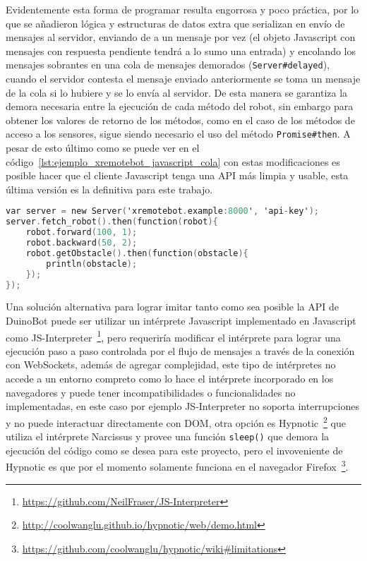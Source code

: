 Evidentemente esta forma de programar resulta engorrosa y poco práctica,
por lo que se añadieron
lógica y estructuras de datos extra que serializan en envío de mensajes al
servidor, enviando de a un mensaje por vez (el objeto Javascript con
mensajes con respuesta pendiente tendrá a lo sumo una entrada)
y encolando los mensajes sobrantes
en una cola de mensajes demorados (\texttt{Server\#delayed}), cuando
el servidor contesta el mensaje enviado anteriormente se toma un mensaje
de la cola si lo hubiere y se lo envía al servidor. De esta manera
se garantiza la demora necesaria entre la ejecución de cada método
del robot, sin embargo para obtener los valores de retorno de los métodos,
como en el caso de los métodos de acceso a los sensores, sigue siendo
necesario el uso del método \texttt{Promise\#then}. A pesar de esto último
como se puede ver en el código~\ref{lst:ejemplo_xremotebot_javascript_cola}
con estas modificaciones es posible hacer que el cliente Javascript
tenga una API más limpia y usable, esta última versión es la definitiva
para este trabajo.

\begin{lstlisting}[language=C,
caption={Ejemplo de XRemoteBot en Javascript con empleo de una cola para
serializar mensajes},
label=lst:ejemplo_xremotebot_javascript_cola]
var server = new Server('xremotebot.example:8000', 'api-key');
server.fetch_robot().then(function(robot){
    robot.forward(100, 1);
    robot.backward(50, 2);
    robot.getObstacle().then(function(obstacle){
        println(obstacle);
    });
});
\end{lstlisting}


Una solución alternativa para lograr imitar tanto como sea posible la
API de DuinoBot puede ser utilizar un intérprete Javascript implementado en
Javascript como
JS-Interpreter~\footnote{\url{https://github.com/NeilFraser/JS-Interpreter}},
pero requeriría modificar el intérprete para lograr una ejecución paso a paso
controlada por el flujo de mensajes a través de la conexión con WebSockets,
además de agregar complejidad, este tipo de intérpretes no accede a un entorno
compreto como lo hace el intérprete incorporado en los navegadores y puede
tener incompatibilidades o funcionalidades no implementadas, en este caso
por ejemplo JS-Interpreter no soporta interrupciones y no puede interactuar
directamente con DOM, otra opción es
Hypnotic~\footnote{\url{http://coolwanglu.github.io/hypnotic/web/demo.html}}
que utiliza el intérprete Narcissus y provee una función \texttt{sleep()} que
demora la ejecución del código como se desea para este proyecto, pero el
invoveniente de Hypnotic es que por el momento solamente funciona en el
navegador
Firefox~\footnote{\url{https://github.com/coolwanglu/hypnotic/wiki\#limitations}}.


